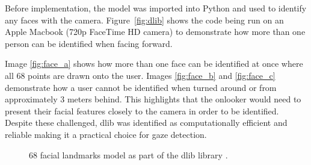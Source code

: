 \documentclass[12pt]{article}
\theoremstyle{plain}
\theoremstyle{definition}
\begin{document}
Before implementation, the model was imported into Python and used to identify any faces with the camera. Figure~\ref{fig:dlib} shows the code being run on an Apple Macbook (720p FaceTime HD camera) to demonstrate how more than one person can be identified when facing forward.

Image \ref{fig:face_a} shows how more than one face can be identified at once where all 68 points are drawn onto the user. Images \ref{fig:face_b} and \ref{fig:face_c} demonstrate how a user cannot be identified when turned around or from approximately 3 meters behind. This highlights that the onlooker would need to present their facial features closely to the camera in order to be identified. Despite these challenged, dlib was identified as computationally efficient and reliable making it a practical choice for gaze detection.


\begin{figure}[h!]
\centering
{}

\caption{68 facial landmarks model as part of the dlib library \cite{noauthor_dlib_nodate}. }
\label{fig:facial-landmarks}
\end{figure}
\end{document}
